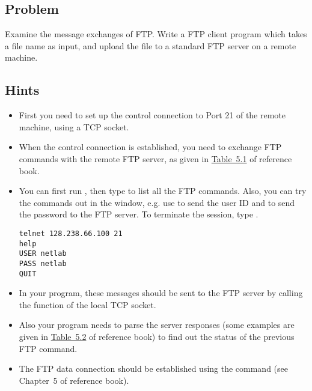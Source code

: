 \documentclass{../UTNetLab}
\begin{document}
\subsection*{Problem}
Examine the message exchanges of FTP.
Write a FTP client program which takes a file name as input, and upload the file to a standard FTP server on a remote machine.

\subsection*{Hints}
\begin{itemize}
    \item First you need to set up the control connection to Port 21 of the remote machine, using a TCP socket.
    \item When the control connection is established, you need to exchange FTP commands with the remote FTP server, as given in \hyperref[tab:5.1]{Table~5.1} of reference book.
    \item You can first run , then type  to list all the FTP commands.
          Also, you can try the commands out in the  window, e.g. use  to send the user ID and  to send the password to the FTP server.
          To terminate the  session, type .
          
          \begin{lstlisting}
telnet 128.238.66.100 21
help
USER netlab
PASS netlab
QUIT
          \end{lstlisting}
    \item In your program, these messages should be sent to the FTP server by calling the  function of the local TCP socket.
    \item Also your program needs to parse the server responses (some examples are given in \hyperref[tab:5.2]{Table~5.2} of reference book) to find out the status of the previous FTP command.
    \item The FTP data connection should be established using the  command (see Chapter~5 of reference book).
\end{itemize}
\end{document}
